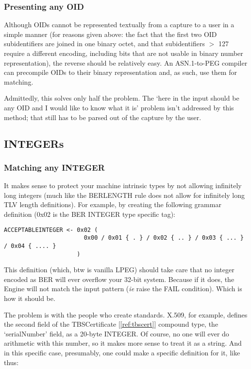 \subsubsection{Presenting any OID}
Although OIDs cannot be represented textually from a capture to a user in 
a simple manner (for reasons given above: the fact that the first two OID 
subidentifiers are joined in one binary octet, and that subidentifiers $>$ 
127 require a different encoding, including bits that are not usable in 
binary number representation), the reverse should be relatively easy. An 
ASN.1-to-PEG compiler can precompile OIDs to their binary representation 
and, as such, use them for matching.

Admittedly, this solves only half the problem. The ‘here in the input 
should be any OID and I would like to know what it is’ problem isn’t 
addressed by this method; that still has to be parsed out of the capture 
by the user.

\subsection{INTEGERs}

\subsubsection{Matching any INTEGER}
It makes sense to protect your machine intrinsic types by not allowing 
infinitely long integers (much like the BERLENGTH rule does not allow for 
infinitely long TLV length definitions). For example, by creating the 
following grammar definition (0x02 is the BER INTEGER type specific tag):

\begin{changemargin}{-60mm}{0mm}
\begin{myquote}
\begin{verbatim}
ACCEPTABLEINTEGER <- 0x02 (
                       0x00 / 0x01 { . } / 0x02 { .. } / 0x03 { ... } / 0x04 { .... }
                     )
\end{verbatim}
\end{myquote}
\end{changemargin}

This definition (which, btw is vanilla LPEG)
should take care that no integer encoded as BER will ever 
overflow your 32-bit system.
Because if it does, the Engine will not match the input pattern
(\textit{ie} raise the FAIL condition). Which is how it should be.

The problem is with the people who create standards.
X.509, for example, defines the second field 
of the TBSCertificate [\ref{ref:tbscert}]
compound type, the ‘serialNumber’ field, as a 
20-byte INTEGER. Of course, no one will ever do arithmetic with this 
number, so it makes more sense to treat it as a string. And in this specific 
case, presumably, one could make a specific definition for it, like thus:

